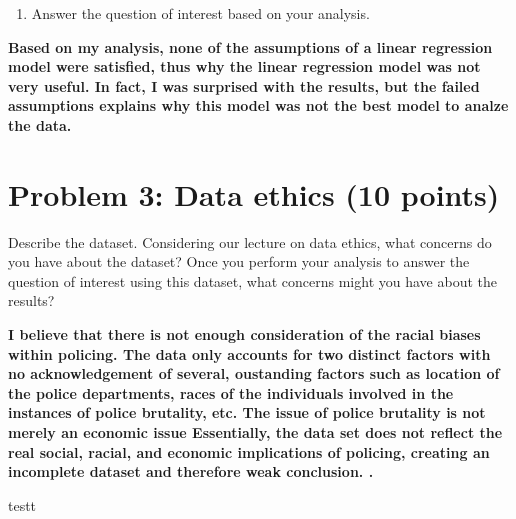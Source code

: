 \documentclass[
]{article}
\providecommand{\tightlist}{%
  \setlength{\itemsep}{0pt}\setlength{\parskip}{0pt}}
\begin{document}
\begin{enumerate}
\def\labelenumi{\alph{enumi}.}
\setcounter{enumi}{4}
\tightlist
\item
  Answer the question of interest based on your analysis.
\end{enumerate}

\textbf{Based on my analysis, none of the assumptions of a linear
regression model were satisfied, thus why the linear regression model
was not very useful. In fact, I was surprised with the results, but the
failed assumptions explains why this model was not the best model to
analze the data.}

\hypertarget{problem-3-data-ethics-10-points}{%
\section{Problem 3: Data ethics (10
points)}\label{problem-3-data-ethics-10-points}}

Describe the dataset. Considering our lecture on data ethics, what
concerns do you have about the dataset? Once you perform your analysis
to answer the question of interest using this dataset, what concerns
might you have about the results?

\textbf{I believe that there is not enough consideration of the racial
biases within policing. The data only accounts for two distinct factors
with no acknowledgement of several, oustanding factors such as location
of the police departments, races of the individuals involved in the
instances of police brutality, etc. The issue of police brutality is not
merely an economic issue Essentially, the data set does not reflect the
real social, racial, and economic implications of policing, creating an
incomplete dataset and therefore weak conclusion. .}

testt
\end{document}
